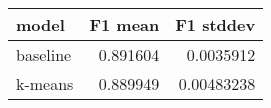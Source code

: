 \begin{tabular}{lrr}
\toprule
 model    &   F1 mean &   F1 stddev \\
\midrule
 baseline &  0.891604 &  0.0035912  \\
 k-means  &  0.889949 &  0.00483238 \\
\bottomrule
\end{tabular}